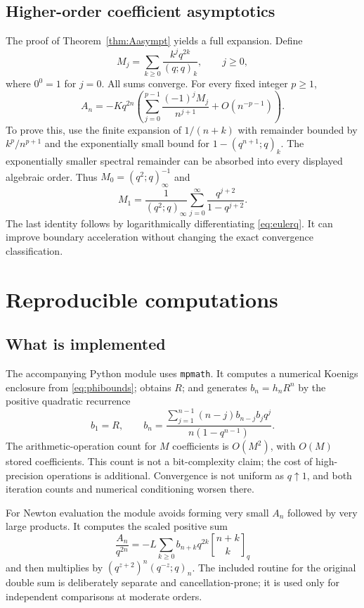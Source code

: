 \documentclass[11pt,letterpaper]{article}
\theoremstyle{definition}\newtheorem{definition}[theorem]{Definition}
\theoremstyle{remark}\newtheorem{remark}[theorem]{Remark}
\newcommand{\qb}[2]{\genfrac{[}{]}{0pt}{}{#1}{#2}_{\!q}}
\numberwithin{equation}{section}
\begin{document}
\subsection{Higher-order coefficient asymptotics}
The proof of Theorem~\ref{thm:Aasympt} yields a full expansion. Define
\[
 M_j=\sum_{k\geq0}\frac{k^j q^{2k}}{(q;q)_k},\qquad j\geq0,
\]
where $0^0=1$ for $j=0$. All sums converge. For every fixed integer $p\geq1$,
\begin{equation}\label{eq:Aallorders}
 A_n=-Kq^{2n}\left(\sum_{j=0}^{p-1}\frac{(-1)^jM_j}{n^{j+1}}
 +O(n^{-p-1})\right).
\end{equation}
To prove this, use the finite expansion of $1/(n+k)$ with remainder bounded by $k^p/n^{p+1}$ and the exponentially small bound for $1-(q^{n+1};q)_k$. The exponentially smaller spectral remainder can be absorbed into every displayed algebraic order. Thus $M_0=(q^2;q)_\infty^{-1}$ and
\[
 M_1=\frac1{(q^2;q)_\infty}\sum_{j=0}^{\infty}\frac{q^{j+2}}{1-q^{j+2}}.
\]
The last identity follows by logarithmically differentiating \eqref{eq:eulerq}. It can improve boundary acceleration without changing the exact convergence classification.

\section{Reproducible computations}\label{sec:computations}

\subsection{What is implemented}
The accompanying Python module uses \texttt{mpmath}. It computes a numerical Koenigs enclosure from \eqref{eq:phibounds}; obtains $R$; and generates $b_n=h_nR^n$ by the positive quadratic recurrence
\begin{equation}\label{eq:brec}
 b_1=R,\qquad
 b_n=\frac{\sum_{j=1}^{n-1}(n-j)b_{n-j}b_jq^j}{n(1-q^{n-1})}.
\end{equation}
The arithmetic-operation count for $M$ coefficients is $O(M^2)$, with $O(M)$ stored coefficients. This count is not a bit-complexity claim; the cost of high-precision operations is additional. Convergence is not uniform as $q\uparrow1$, and both iteration counts and numerical conditioning worsen there.

For Newton evaluation the module avoids forming very small $A_n$ followed by very large products. It computes the scaled positive sum
\begin{equation}\label{eq:scaledA}
 \frac{A_n}{q^{2n}}=-L\sum_{k\geq0}b_{n+k}q^{2k}\qb{n+k}{k}
\end{equation}
and then multiplies by $(q^{z+2})^n(q^{-z};q)_n$. The included routine for the original double sum is deliberately separate and cancellation-prone; it is used only for independent comparisons at moderate orders.
\end{document}

